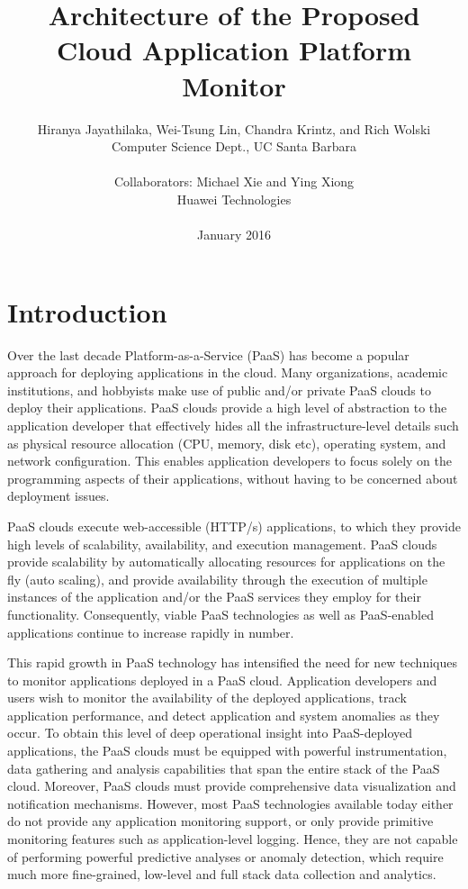 \documentclass[11pt]{article}
\begin{document}
\title{Architecture of the Proposed Cloud Application Platform Monitor}
\author{Hiranya Jayathilaka, Wei-Tsung Lin, Chandra Krintz, and 
Rich Wolski \\
Computer Science Dept., UC Santa Barbara \\
\\
Collaborators: Michael Xie and Ying Xiong \\
Huawei Technologies\\
\\
January 2016
}
\date{}
\maketitle

\section{Introduction}
Over the last decade Platform-as-a-Service (PaaS) has become a popular approach for deploying
applications in the cloud. Many organizations, academic institutions, and hobbyists make use of public
and/or private PaaS clouds to deploy their applications.
PaaS clouds provide a high level of abstraction to the application developer that effectively hides
all the infra\-structure-level details such as physical resource allocation (CPU, memory, disk etc), operating
system,
and network configuration. This enables application developers to focus solely on the programming
aspects of their applications, without having to be concerned about deployment issues. 

PaaS clouds execute web-accessible (HTTP/s) applications, to which they provide high levels of scalability, availability, and execution management. 
PaaS clouds provide scalability by automatically allocating resources 
for applications on the fly (auto scaling), and provide availability through
the execution of multiple instances of the application and/or the PaaS
services they employ for their functionality.
Consequently, viable PaaS technologies as well as
PaaS-enabled applications continue to increase rapidly in number.

This rapid growth in PaaS technology has intensified the need 
for new techniques to
monitor applications deployed in a PaaS cloud. Application developers and users wish
to monitor the availability of the deployed applications, track application performance, and detect 
application and system anomalies as they occur. To obtain this level of deep operational insight into
PaaS-deployed applications, the PaaS clouds must be equipped with powerful instrumentation,
data gathering and analysis capabilities that span the entire stack of the PaaS cloud. 
Moreover, PaaS clouds must provide comprehensive
data visualization and notification mechanisms. However, most PaaS technologies available
today either do not provide any application monitoring support, or only provide primitive
monitoring features such as application-level logging. Hence, they are not capable of performing
powerful predictive analyses or anomaly detection, which require much more fine-grained, low-level
and full stack data collection and analytics. 
\end{document}
